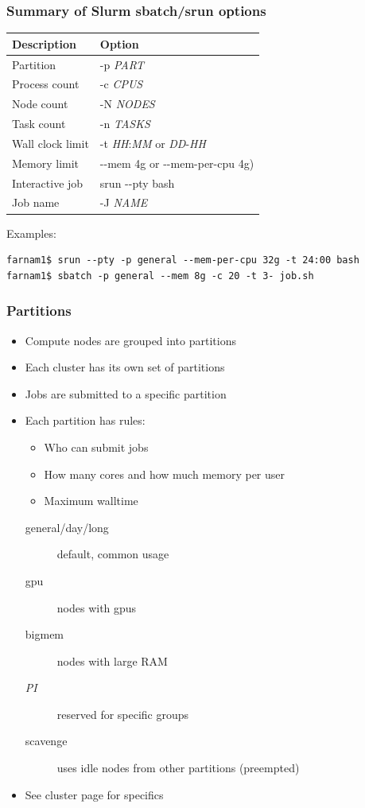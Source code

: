 \documentclass[10pt]{beamer}
\newcommand\smallfont{\fontsize{8pt}{7.2}\selectfont}
\begin{document}
\begin{frame}[fragile]
\frametitle{Summary of Slurm sbatch/srun options}
\begin{tabular}{|l|l|}
\hline
\textbf{Description} & \textbf{Option} \\
\hline
Partition & -p \textit{PART} \\
\hline
Process count & -c \textit{CPUS} \\
\hline
Node count & -N \textit{NODES} \\
\hline
Task count & -n \textit{TASKS} \\
\hline
Wall clock limit & -t \textit{HH}:\textit{MM} or \textit{DD}-\textit{HH}\\
\hline
Memory limit & -{}-mem 4g or -{}-mem-per-cpu 4g)\\
\hline
Interactive job & srun -{}-pty bash \\
\hline
Job name & -J \textit{NAME} \\
\hline
\end{tabular}

\vskip10pt
Examples:
\smallfont
\begin{verbatim}
farnam1$ srun --pty -p general --mem-per-cpu 32g -t 24:00 bash 
farnam1$ sbatch -p general --mem 8g -c 20 -t 3- job.sh   
\end{verbatim}
\end{frame}

\begin{frame}[fragile]
\frametitle{Partitions}
\begin{itemize}
\item Compute nodes are grouped into partitions
\item Each cluster has its own set of partitions
\item Jobs are submitted to a specific partition
\item Each partition has rules:
\begin{itemize}
\item Who can submit jobs
\item How many cores and how much memory per user
\item Maximum walltime
\end{itemize}
\begin{description}
\item [general/day/long] default, common usage
\item [gpu] nodes with gpus
\item [bigmem] nodes with large RAM
\item [\textit{PI}] reserved for specific groups
\item [scavenge] uses idle nodes from other partitions (preempted)
\end{description}
\item See cluster page for specifics
\end{itemize}

\end{frame}
\end{document}
